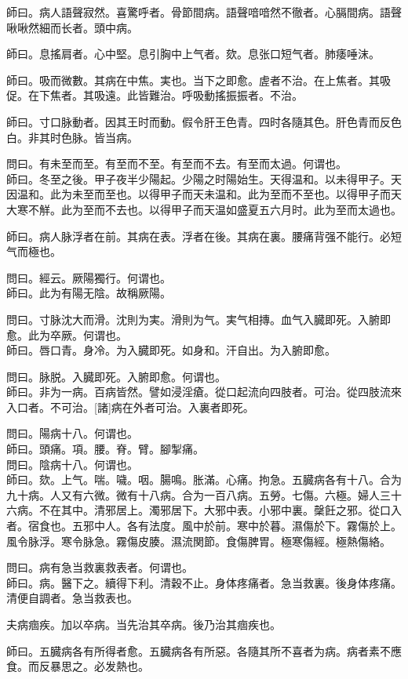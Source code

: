 \documentclass[12pt,twoside,UTF8,b5paper]{ctexbook}
\begin{document}
師曰。病人語聲寂然。喜驚呼者。骨節間病。語聲喑喑然不徹者。心膈間病。語聲啾啾然細而长者。頭中病。

師曰。息搖肩者。心中堅。息引胸中上气者。欬。息张口短气者。肺痿唾沫。

師曰。吸而微數。其病在中焦。実也。当下之即愈。虗者不治。在上焦者。其吸促。在下焦者。其吸遠。此皆難治。呼吸動搖振振者。不治。

師曰。寸口脉動者。因其王时而動。假令肝王色青。四时各隨其色。肝色青而反色白。非其时色脉。皆当病。

問曰。有未至而至。有至而不至。有至而不去。有至而太過。何谓也。\\
師曰。冬至之後。甲子夜半少陽起。少陽之时陽始生。天得温和。以未得甲子。天因温和。此为未至而至也。以得甲子而天未温和。此为至而不至也。以得甲子而天大寒不觧。此为至而不去也。以得甲子而天温如盛夏五六月时。此为至而太過也。

師曰。病人脉浮者在前。其病在表。浮者在後。其病在裏。腰痛背强不能行。必短气而極也。

問曰。經云。厥陽獨行。何谓也。\\
師曰。此为有陽无陰。故稱厥陽。

問曰。寸脉沈大而滑。沈則为実。滑則为气。実气相摶。血气入臓即死。入腑即愈。此为卒厥。何谓也。\\
師曰。唇口青。身冷。为入臓即死。如身和。汗自出。为入腑即愈。

問曰。脉脱。入臓即死。入腑即愈。何谓也。\\
師曰。非为一病。百病皆然。譬如浸淫瘡。從口起流向四肢者。可治。從四肢流來入口者。不可治。[諸]病在外者可治。入裏者即死。

問曰。陽病十八。何谓也。\\
師曰。頭痛。項。腰。脊。臂。腳掣痛。\\
問曰。陰病十八。何谓也。\\
師曰。欬。上气。喘。噦。咽。腸鳴。胀滿。心痛。拘急。五臓病各有十八。合为九十病。人又有六微。微有十八病。合为一百八病。五勞。七傷。六極。婦人三十六病。不在其中。清邪居上。濁邪居下。大邪中表。小邪中裏。䅽飪之邪。從口入者。宿食也。五邪中人。各有法度。風中於前。寒中於暮。濕傷於下。霧傷於上。風令脉浮。寒令脉急。霧傷皮腠。濕流関節。食傷脾胃。極寒傷經。極熱傷絡。

問曰。病有急当救裏救表者。何谓也。\\
師曰。病。醫下之。續得下利。清穀不止。身体疼痛者。急当救裏。後身体疼痛。清便自調者。急当救表也。

夫病痼疾。加以卒病。当先治其卒病。後乃治其痼疾也。

師曰。五臓病各有所得者愈。五臓病各有所惡。各隨其所不喜者为病。病者素不應食。而反暴思之。必发熱也。
\end{document}
